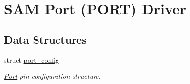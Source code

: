 \hypertarget{group__asfdoc__sam0__port__group}{}\section{S\+AM Port (P\+O\+RT) Driver}
\label{group__asfdoc__sam0__port__group}
\subsection*{Data Structures}
\begin{DoxyCompactItemize}
\item 
struct \mbox{\hyperlink{structport__config}{port\+\_\+config}}
\begin{DoxyCompactList}\small\item\em \mbox{\hyperlink{struct_port}{Port}} pin configuration structure. \end{DoxyCompactList}\end{DoxyCompactItemize}
